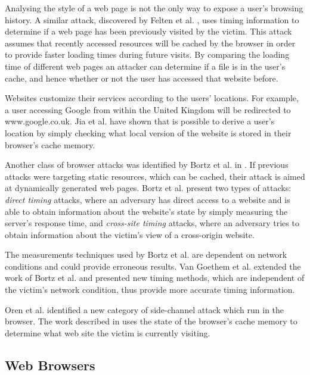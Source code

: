 \documentclass[10pt,a4paper,twoside]{book}
\begin{document}
Analysing the style of a web page is not the only way to expose a user's browsing history. A similar attack, discovered by Felten et al. \cite{felten2000timing}, uses timing information to determine if a web page has been previously visited by the victim. This attack assumes that recently accessed resources will be cached by the browser in order to provide faster loading times during future visits. By comparing the loading time of different web pages an attacker can determine if a file is in the user’s cache, and hence whether or not the user has accessed that website before.

Websites customize their services according to the users’ locations. For example, a user accessing Google from within the United Kingdom will be redirected to www.google.co.uk. Jia et al. \cite{jia2015know} have shown that is possible to derive a user's location by simply checking what local version of the website is stored in their browser's cache memory.

Another class of browser attacks was identified by Bortz et al. in \cite{bortz2007exposing}. If previous attacks were targeting static resources, which can be cached, their attack is aimed at dynamically generated web pages. Bortz et al. \cite{bortz2007exposing} present two types of attacks: \textit{direct timing} attacks, where an adversary has direct access to a website and is able to obtain information about the website's state by simply measuring the server's response time, and \textit{cross-site timing} attacks, where an adversary tries to obtain information about the victim's view of a cross-origin website.

The measurements techniques used by Bortz et al. \cite{bortz2007exposing} are dependent on network conditions and could provide erroneous results. Van Goethem et al.\cite{van2015clock} extended the work of Bortz et al. \cite{bortz2007exposing} and presented new timing methods, which are independent of the victim's network condition, thus provide more accurate timing information. 

Oren et al. \cite{oren2015spy} identified a new category of side-channel attack which run in the browser. The work described in \cite{oren2015spy} uses the state of the browser's cache memory to determine what web site the victim is currently visiting.

\subsection{Web Browsers}
\end{document}
